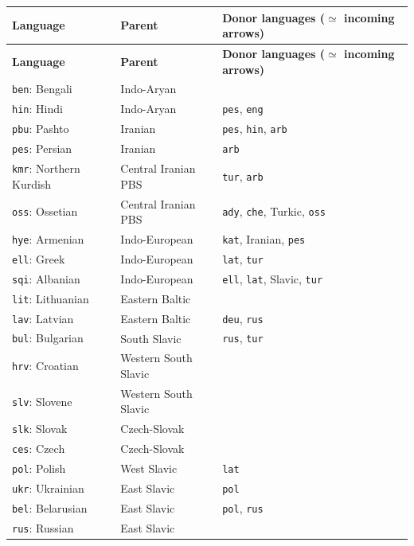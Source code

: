 \begin{center}
\footnotesize

\begin{longtable}{lll}
\hline\hline
\textbf{Language} & \textbf{Parent} & \textbf{Donor languages ($\simeq$ incoming arrows)}\\
\hline
\endfirsthead
\hline\hline
\textbf{Language} & \textbf{Parent} & \textbf{Donor languages ($\simeq$ incoming arrows)}\\
\hline
\endhead
\hline
\endfoot
\hline
\endlastfoot

\texttt{ben}: Bengali & Indo-Aryan & \\
\texttt{hin}: Hindi & Indo-Aryan & \texttt{pes}, \texttt{eng}\\
\texttt{pbu}: Pashto & Iranian & \texttt{pes}, \texttt{hin}, \texttt{arb}\\
\texttt{pes}: Persian & Iranian & \texttt{arb}\\
\texttt{kmr}: Northern Kurdish & Central Iranian PBS & \texttt{tur}, \texttt{arb}\\
\texttt{oss}: Ossetian & Central Iranian PBS & \texttt{ady}, \texttt{che}, Turkic, \texttt{oss}\\
\texttt{hye}: Armenian & Indo-European & \texttt{kat}, Iranian, \texttt{pes}\\
\texttt{ell}: Greek & Indo-European & \texttt{lat}, \texttt{tur}\\
\texttt{sqi}: Albanian & Indo-European & \texttt{ell}, \texttt{lat}, Slavic, \texttt{tur}\\
\texttt{lit}: Lithuanian & Eastern Baltic & \\
\texttt{lav}: Latvian & Eastern Baltic & \texttt{deu}, \texttt{rus}\\
\texttt{bul}: Bulgarian & South Slavic & \texttt{rus}, \texttt{tur}\\
\texttt{hrv}: Croatian & Western South Slavic & \\
\texttt{slv}: Slovene & Western South Slavic & \\
\texttt{slk}: Slovak & Czech-Slovak & \\
\texttt{ces}: Czech & Czech-Slovak & \\
\texttt{pol}: Polish & West Slavic & \texttt{lat}\\
\texttt{ukr}: Ukrainian & East Slavic & \texttt{pol}\\
\texttt{bel}: Belarusian & East Slavic & \texttt{pol}, \texttt{rus}\\
\texttt{rus}: Russian & East Slavic & \\

\end{longtable}
\end{center}

